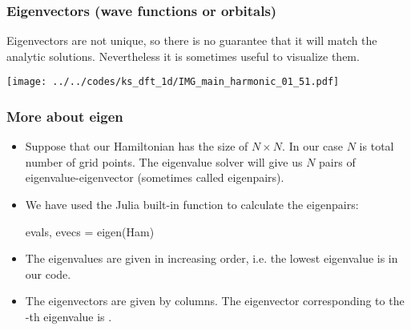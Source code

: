 \begin{frame}
\frametitle{Eigenvectors (wave functions or orbitals)}

Eigenvectors are not unique, so there is no guarantee that it will
match the analytic solutions. Nevertheless it is sometimes useful
to visualize them.

{\centering
\texttt{[image: ../../codes/ks\_dft\_1d/IMG\_main\_harmonic\_01\_51.pdf]}
\par}

\end{frame}


\begin{frame}[fragile]
\frametitle{More about eigen}

\begin{itemize}
\item Suppose that our Hamiltonian has the size of $N \times N$. In our case $N$ is
total number of grid points.
The eigenvalue solver will give us $N$ pairs of eigenvalue-eigenvector
(sometimes called eigenpairs).
%
\item We have used the Julia built-in function  to calculate the eigenpairs:
\begin{juliacode}
evals, evecs = eigen(Ham)
\end{juliacode}
%
\item The eigenvalues are given in increasing order, i.e. the lowest eigenvalue
is  in our code.
%
\item The eigenvectors are given by columns.
The eigenvector corresponding to the -th eigenvalue is
.
\end{itemize}




\end{frame}


